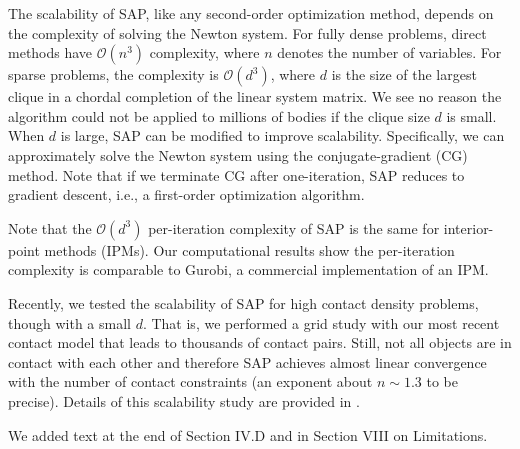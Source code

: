 The scalability of SAP, like any second-order optimization method, depends on
the complexity of solving the Newton system. For fully dense problems, direct
methods have $\mathcal{O}(n^3)$ complexity, where $n$ denotes the number of
variables. For sparse problems, the complexity is $\mathcal{O}(d^3)$, where $d$
is the size of the largest clique in a chordal completion of the linear system
matrix.  We see no reason the algorithm could not be applied to millions of
bodies if the clique size $d$ is small.  When $d$ is large, SAP can be modified
to improve scalability. Specifically, we can approximately solve the Newton
system using the conjugate-gradient (CG) method. Note that if we terminate CG
after one-iteration, SAP reduces to gradient descent, i.e., a first-order
optimization algorithm.

Note that the $\mathcal{O}(d^3)$ per-iteration complexity of SAP is the same for
interior-point methods (IPMs).  Our computational results show the per-iteration
complexity is comparable to Gurobi, a commercial implementation of an IPM.

Recently, we tested the scalability of SAP for high contact density problems,
though with a small $d$. That is, we performed a grid study with our most recent
contact model that leads to thousands of contact pairs. Still, not all objects
are in contact with each other and therefore SAP achieves almost linear
convergence with the number of contact constraints (an exponent about $n\sim1.3$
to be precise). Details of this scalability study are provided in
\cite{bib:masterjohn2021discrete}.

We added text at the end of Section IV.D and in Section VIII on Limitations.

